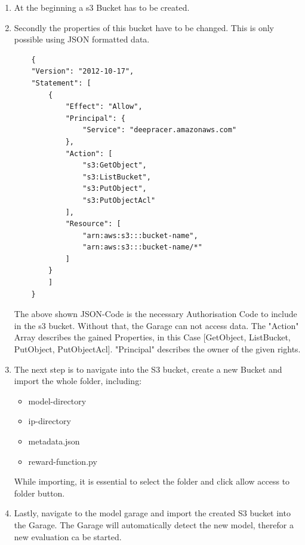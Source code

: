 \begin{enumerate}
    \item At the beginning a s3 Bucket has to be created.
    \item Secondly the properties of this bucket have to be changed. This is only possible using JSON formatted data.
    \begin{listing}[H]
    \begin{verbatim}
    {
    "Version": "2012-10-17",
    "Statement": [
        {
            "Effect": "Allow",
            "Principal": {
                "Service": "deepracer.amazonaws.com"
            },
            "Action": [
                "s3:GetObject",
                "s3:ListBucket",
                "s3:PutObject",
                "s3:PutObjectAcl"
            ],
            "Resource": [
                "arn:aws:s3:::bucket-name",
                "arn:aws:s3:::bucket-name/*"
            ]
        }
        ]
    }
    \end{verbatim}
    \end{listing}
    
    The above shown JSON-Code is the necessary Authorisation Code to include in the s3 bucket. Without that, the Garage can not access data. The "Action" Array describes the gained Properties, in this Case [GetObject, ListBucket, PutObject, PutObjectAcl]. "Principal" describes the owner of the given rights.
    \item The next step is to navigate into the S3 bucket, create a new Bucket and import the whole folder, including:
    \begin{itemize}
        \item model-directory
        \item ip-directory
        \item metadata.json
        \item reward-function.py
    \end{itemize}
    While importing, it is essential to select the folder and click allow access to folder button.
    \item Lastly, navigate to the model garage and import the created S3 bucket into the Garage. The Garage will automatically detect the new model, therefor a new evaluation ca be started.
\end{enumerate}

